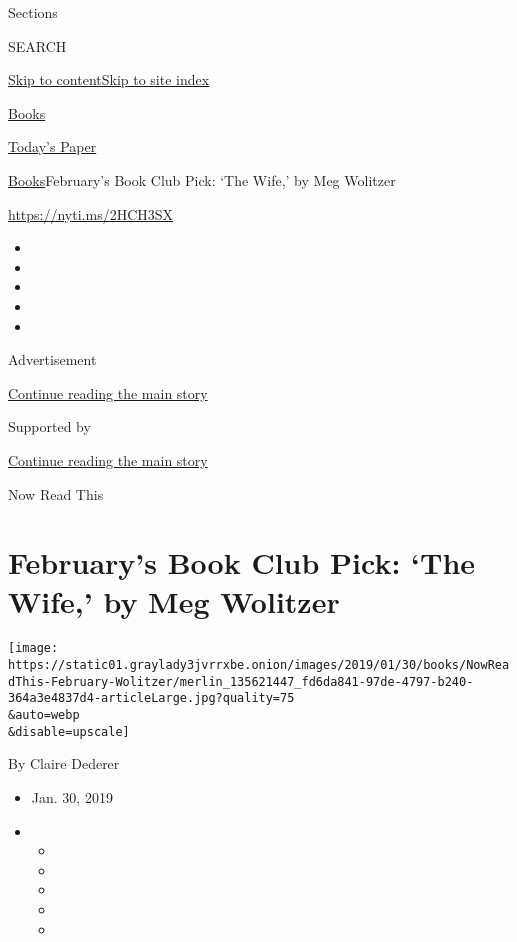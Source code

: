 Sections

SEARCH

\protect\hyperlink{site-content}{Skip to
content}\protect\hyperlink{site-index}{Skip to site index}

\href{https://www.nytimes3xbfgragh.onion/section/books}{Books}

\href{https://myaccount.nytimes3xbfgragh.onion/auth/login?response_type=cookie\&client_id=vi}{}

\href{https://www.nytimes3xbfgragh.onion/section/todayspaper}{Today's
Paper}

\href{/section/books}{Books}\textbar{}February's Book Club Pick: `The
Wife,' by Meg Wolitzer

\url{https://nyti.ms/2HCH3SX}

\begin{itemize}
\item
\item
\item
\item
\item
\end{itemize}

Advertisement

\protect\hyperlink{after-top}{Continue reading the main story}

Supported by

\protect\hyperlink{after-sponsor}{Continue reading the main story}

Now Read This

\hypertarget{februarys-book-club-pick-the-wife-by-meg-wolitzer}{%
\section{February's Book Club Pick: `The Wife,' by Meg
Wolitzer}\label{februarys-book-club-pick-the-wife-by-meg-wolitzer}}

\texttt{[image: https://static01.graylady3jvrrxbe.onion/images/2019/01/30/books/NowReadThis-February-Wolitzer/merlin\_135621447\_fd6da841-97de-4797-b240-364a3e4837d4-articleLarge.jpg?quality=75\\\&auto=webp\\\&disable=upscale]}

By Claire Dederer

\begin{itemize}
\item
  Jan. 30, 2019
\item
  \begin{itemize}
  \item
  \item
  \item
  \item
  \item
  \end{itemize}
\end{itemize}

